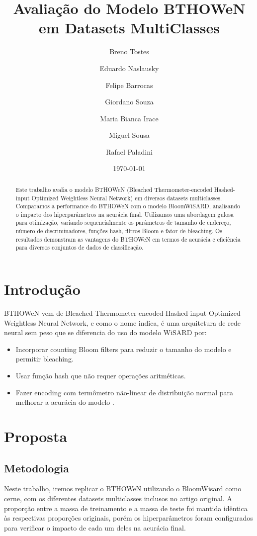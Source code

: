 \documentclass{article}
\title{Avaliação do Modelo BTHOWeN em Datasets MultiClasses}
\author{Breno Tostes \and Eduardo Naslausky \and Felipe Barrocas \and Giordano Souza \and Maria Bianca Irace \and Miguel Sousa \and Rafael Paladini}
\date{\today}
\begin{document}
\maketitle

\begin{abstract}
Este trabalho avalia o modelo BTHOWeN (Bleached Thermometer-encoded Hashed-input Optimized Weightless Neural Network) em diversos datasets multiclasses. Comparamos a performance do BTHOWeN com o modelo BloomWiSARD, analisando o impacto dos hiperparâmetros na acurácia final. Utilizamos uma abordagem gulosa para otimização, variando sequencialmente os parâmetros de tamanho de endereço, número de discriminadores, funções hash, filtros Bloom e fator de bleaching. Os resultados demonstram as vantagens do BTHOWeN em termos de acurácia e eficiência para diversos conjuntos de dados de classificação.
\end{abstract}

\section{Introdução}

BTHOWeN vem de Bleached Thermometer-encoded Hashed-input Optimized Weightless Neural Network, e como o nome indica, é uma arquitetura de rede neural sem peso que se diferencia do uso do modelo WiSARD por:

\begin{itemize}
    \item Incorporar counting Bloom filters para reduzir o tamanho do modelo e permitir bleaching.
    \item Usar função hash que não requer operações aritméticas.
    \item Fazer encoding com termômetro não-linear de distribuição normal para melhorar a acurácia do modelo \cite{susskind2022}.
\end{itemize}

\section{Proposta}
\subsection{Metodologia}

Neste trabalho, iremos replicar o BTHOWeN utilizando o BloomWisard como cerne, com os diferentes datasets multiclasses inclusos no artigo original. A proporção entre a massa de treinamento e a massa de teste foi mantida idêntica às respectivas proporções originais, porém os hiperparâmetros foram configurados para verificar o impacto de cada um deles na acurácia final.
\end{document}
